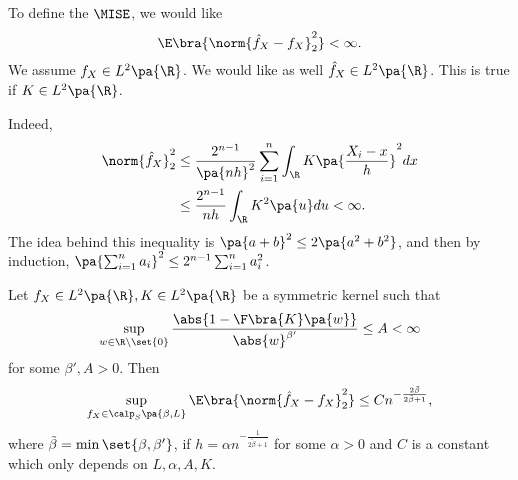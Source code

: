 \newpage
{}

\begin{remark}
  To define the $\MISE$, we would like
  \begin{equation}
    \E\bra{\norm{\hat{f}_X - f_X}^2_2} < \infty.
  \end{equation}
  We assume $f_X\in L^2\pa{\R}$. We would like as well $\hat{f}_X\in L^2\pa{\R}$. This is true if $K\in L^2\pa{\R}$.

  Indeed,
  \begin{equation}
  \begin{split}
    \norm{\hat{f}_X}_2^2 &\leq \frac{2^{n-1}}{\pa{nh}^2} \sum_{i=1}^n \int_\R K\pa{\frac{X_i -x}{h}}^2 dx \\
    &\leq \frac{2^{n-1}}{nh} \int_{\R} K^2\pa{u} du <\infty.
    \end{split}
  \end{equation}
  The idea behind this inequality is $\pa{a+b}^2 \leq 2 \pa{a^2 + b^2}$, and then by induction, $\pa{\sum_{i=1}^n a_i }^2 \leq 2^{n-1} \sum_{i=1}^n a_i^2$.
\end{remark}

\begin{theorem}
  Let $f_X\in L^2\pa{\R}, K\in L^2\pa{\R}$ be a symmetric kernel such that
  \begin{equation}\label{eq:tocheck}
    \sup_{w\in \R\setminus \set{0}} \frac{\abs{1- \F \bra{K} \pa{w}}}{\abs{w}^{\beta'}}\leq A <\infty
  \end{equation}
  for some $\beta',A>0$. Then
  \begin{equation}
    \sup_{f_X\in \calp_S \pa{\beta, L}} \E\bra{\norm{\hat{f}_X - f_X}^2_2}\leq C n^{-\frac{2\tilde{\beta}}{2\tilde{\beta}+1}},
  \end{equation}
  where $\tilde{\beta}=\min \set{\beta,\beta'}$, if $h= \alpha n^{-\frac{1}{2\tilde{\beta} +1}}$ for some $\alpha >0$ and $C$ is a constant which only depends on $L,\alpha,A,K$.
\end{theorem}

